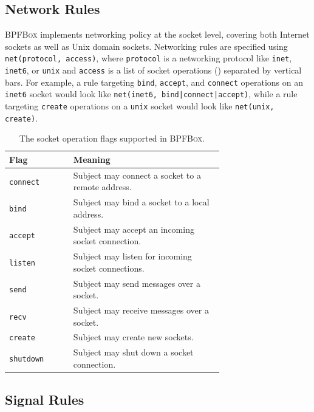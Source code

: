 \documentclass[
  fontsize=12pt,
  titlepage=firstiscover,
  paper=letter,
oneside,
  cleardoublepage=plain,
  parskip=half-,
  DIV=10,
  parindent,
  appendixprefix,
  chapterprefix,
  listof=totoc,
]{scrbook}
\newcommand{\bpfbox}{\textsc{BPFBox}}
\begin{document}
\subsection{Network Rules}\label{ss:bpfbox-network-rules}

\bpfbox{} implements networking policy at the socket level, covering both Internet sockets
as well as Unix domain sockets. Networking rules are specified using
\lstinline[language=bpfbox]{net(protocol, access)}, where
\lstinline[language=bpfbox]{protocol} is a networking protocol like \texttt{inet},
\texttt{inet6}, or \texttt{unix} and \lstinline[language=bpfbox]{access} is a list of
socket operations () separated by vertical bars. For example, a rule
targeting \texttt{bind}, \texttt{accept}, and \texttt{connect} operations on an
\texttt{inet6} socket would look like \lstinline[language=bpfbox]{net(inet6, bind|connect|accept)},
while a rule targeting \texttt{create} operations on a \texttt{unix} socket would look
like \lstinline[language=bpfbox]{net(unix, create)}.

\begin{table}[htpb]
    \centering
    \caption{The socket operation flags supported in \bpfbox{}.}
    \label{tab:net-access}
    \begin{tabular}{lp{0.7\linewidth}}
    \toprule
    Flag & Meaning \\
    \midrule
    \texttt{connect}  & Subject may connect a socket to a remote address. \\
    \texttt{bind}     & Subject may bind a socket to a local address. \\
    \texttt{accept}   & Subject may accept an incoming socket connection. \\
    \texttt{listen}   & Subject may listen for incoming socket connections. \\
    \texttt{send}     & Subject may send messages over a socket. \\
    \texttt{recv}     & Subject may receive messages over a socket. \\
    \texttt{create}   & Subject may create new sockets. \\
    \texttt{shutdown} & Subject may shut down a socket connection. \\
    \bottomrule
    \end{tabular}
\end{table}



\subsection{Signal Rules}\label{ss:bpfbox-signal-rules}
\end{document}

